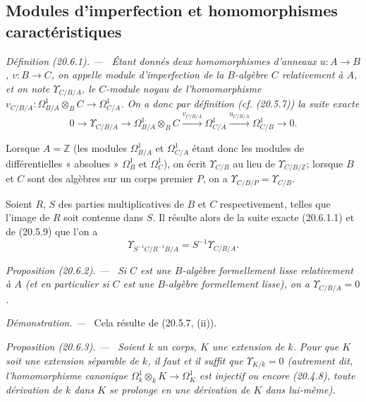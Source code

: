 \documentclass[10pt,oneside]{book}
\makeatletter
\newcommand{\setmanualcurrentlabel}[1]{\def\@currentlabel{#1}}
\newenvironment{definition}[1][]{%
  \setmanualcurrentlabel{#1}\par\medskip\noindent\itshape Définition (#1). ---\ }{\par}
\newenvironment{proposition}[1][]{%
  \setmanualcurrentlabel{#1}\par\medskip\noindent\itshape Proposition (#1). ---\ }{\par}
\newenvironment{proof}{%
  \par\medskip\noindent\textit{Démonstration. ---\ }}{\par}
\makeatother
\begin{document}
\subsection{Modules d'imperfection et homomorphismes caractéristiques}
\label{subsection:0.20.6-fr}
\label{0.20.6-fr}

\begin{definition}[20.6.1]
\label{0.20.6.1-fr}
Étant donnés deux homomorphismes d'anneaux $u:A\to B$, $v:B\to C$, on
appelle \emph{module d'imperfection de la $B$-algèbre $C$ relativement à
$A$}, et on note $\Upsilon_{C/B/A}$, le $C$-module noyau de
l'homomorphisme
$v_{C/B/A}:\Omega^1_{B/A}\otimes_B C\to\Omega^1_{C/A}$.
On a donc par définition (cf. (20.5.7)) la suite exacte
\begin{equation}
\tag{20.6.1.1}
\label{0.20.6.1.1-fr}
  0\longrightarrow\Upsilon_{C/B/A}\longrightarrow
  \Omega^1_{B/A}\otimes_B C\xrightarrow{v_{C/B/A}}
  \Omega^1_{C/A}\xrightarrow{u_{C/B/A}}\Omega^1_{C/B}
  \longrightarrow0.
\end{equation}
\end{definition}

Lorsque $A=\mathbb{Z}$ (les modules $\Omega^1_{B/A}$ et $\Omega^1_{C/A}$
étant donc les modules de différentielles « absolues » $\Omega^1_B$ et
$\Omega^1_C$), on écrit $\Upsilon_{C/B}$ au lieu de
$\Upsilon_{C/B/\mathbb{Z}}$; lorsque $B$ et $C$ sont des algèbres sur un
corps premier $P$, on a $\Upsilon_{C/B/P}=\Upsilon_{C/B}$.

Soient $R$, $S$ des parties multiplicatives de $B$ et $C$ respectivement,
telles que l'image de $R$ soit contenue dans $S$. Il résulte alors de la
suite exacte (20.6.1.1) et de (20.5.9) que l'on a
\begin{equation}
\tag{20.6.1.2}
\label{0.20.6.1.2-fr}
  \Upsilon_{S^{-1}C/R^{-1}B/A}=S^{-1}\Upsilon_{C/B/A}.
\end{equation}

\begin{proposition}[20.6.2]
\label{0.20.6.2-fr}
Si $C$ est une $B$-algèbre formellement lisse relativement à $A$ (et en
particulier si $C$ est une $B$-algèbre formellement lisse), on a
$\Upsilon_{C/B/A}=0$.
\end{proposition}

\begin{proof}
Cela résulte de (20.5.7, (ii)).
\end{proof}

\begin{proposition}[20.6.3]
\label{0.20.6.3-fr}
Soient $k$ un corps, $K$ une extension de $k$. Pour que $K$ soit une
extension séparable de $k$, il faut et il suffit que $\Upsilon_{K/k}=0$
(autrement dit, l'homomorphisme canonique
$\Omega^1_k\otimes_k K\to\Omega^1_K$ est injectif ou encore (20.4.8),
toute dérivation de $k$ dans $K$ se prolonge en une dérivation de $K$
dans lui-même).
\end{proposition}
\end{document}
